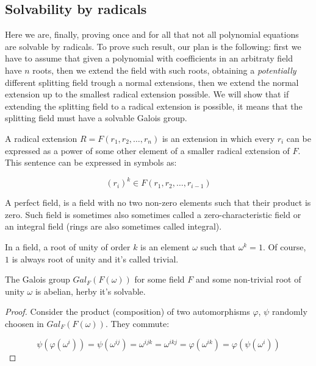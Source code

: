 \subsection{Solvability by radicals}
Here we are, finally, proving once and for all that not all polynomial equations 
are solvable by radicals. To prove such result, our plan is the following: 
first we have to assume that given a polynomial with coefficients in an arbitraty field
have $n$ roots, then we extend the field with such roots, obtaining a \emph{potentially} 
different splitting field trough a normal extensions, then we extend the normal extension 
up to the smallest radical extension possible. We will show that if extending the splitting
field to a radical extension is possible, it means that the splitting field must have a 
solvable Galois group. 
\vspace{0.2em}

\begin{definition}
    A radical extension $R = F(r_1, r_2, \dots, r_n)$ is an extension in which 
    every $r_i$ can be expressed as a power of some other element of a smaller 
    radical extension of $F$. This sentence can be expressed in symbols as:  

    $$ (r_i)^k \in F(r_1, r_2, \dots, r_{i-1}) $$
\end{definition}
\vspace{0.2em}

\begin{definition}
    A perfect field, is a field with no two non-zero elements such that their 
    product is zero. Such field is sometimes also sometimes called a zero-characteristic
    field or an integral field (rings are also sometimes called integral).  
\end{definition}
\vspace{0.2em}

\begin{definition}
    In a field, a root of unity of order $k$ is an element $\omega$ such that 
    $\omega^k = 1$. Of course, $1$ is always root of unity and it's called 
    trivial.  
\end{definition}
\vspace{0.2em}

\begin{lemma}
\label{lem:FOmegaSolvable}
    The Galois group $Gal_{F}(F(\omega))$ for some field $F$ and some 
    non-trivial root of unity $\omega$ is abelian, herby it's solvable. 
\end{lemma}
\begin{proof}
    Consider the product (composition) of two automorphisms $\varphi$, $\psi$ 
    randomly choosen in $Gal_{F}(F(\omega))$. They commute:

    $$ \psi(\varphi(\omega^i)) = \psi(\omega^{ij}) = \omega^{ijk} = 
    \omega^{ikj} = \varphi(\omega^{ik}) = \varphi(\psi(\omega^i)) $$
\end{proof}


